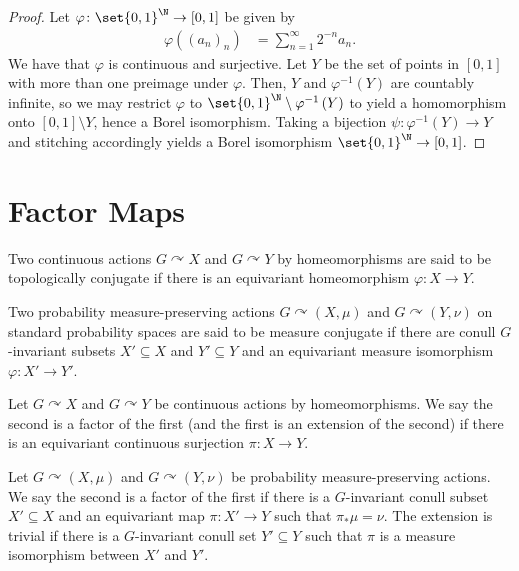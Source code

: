 \documentclass[10pt]{mypackage}
\begin{document}
\begin{proof}
  Let $\varphi\colon \set{0,1}^{\N}\to [0,1]$ be given by
  \begin{align*}
    \varphi\left( \left( a_n \right)_n \right) &= \sum_{n=1}^{\infty} 2^{-n}a_n.
  \end{align*}
  We have that $\varphi$ is continuous and surjective. Let $Y$ be the set of points in $\left[ 0,1 \right]$ with more than one preimage under $\varphi$. Then, $Y$ and $\varphi^{-1}\left( Y \right)$ are countably infinite, so we may restrict $\varphi$ to $\set{0,1}^{\N}\setminus \varphi^{-1}\left( Y \right)$ to yield a homomorphism onto $\left[ 0,1 \right]\setminus Y$, hence a Borel isomorphism. Taking a bijection $\psi\colon \varphi^{-1}\left( Y \right)\to Y$ and stitching accordingly yields a Borel isomorphism $\set{0,1}^{\N}\to [0,1]$.
\end{proof}
\section{Factor Maps}%
\begin{definition}
  Two continuous actions $G\curvearrowright X$ and $G\curvearrowright Y$ by homeomorphisms are said to be topologically conjugate if there is an equivariant homeomorphism $\varphi\colon X\to Y$.

  Two probability measure-preserving actions $G\curvearrowright \left( X,\mu \right)$ and $G\curvearrowright \left( Y,\nu \right)$ on standard probability spaces are said to be measure conjugate if there are conull $G$-invariant subsets $X'\subseteq X$ and $Y'\subseteq Y$ and an equivariant measure isomorphism $\varphi\colon X'\to Y'$.
\end{definition}
\begin{definition}
  Let $G\curvearrowright X$ and $G\curvearrowright Y$ be continuous actions by homeomorphisms. We say the second is a factor of the first (and the first is an extension of the second) if there is an equivariant continuous surjection $\pi\colon X\to Y$.

  Let $G\curvearrowright \left( X,\mu \right)$ and $G\curvearrowright \left( Y,\nu \right)$ be probability measure-preserving actions. We say the second is a factor of the first if there is a $G$-invariant conull subset $X'\subseteq X$ and an equivariant map $\pi\colon X'\to Y$ such that $\pi_{\ast}\mu = \nu$. The extension is trivial if there is a $G$-invariant conull set $Y'\subseteq Y$ such that $\pi$ is a measure isomorphism between $X'$ and $Y'$.
\end{definition}
\nocite{kerr_and_li}
\printbibliography
\end{document}
